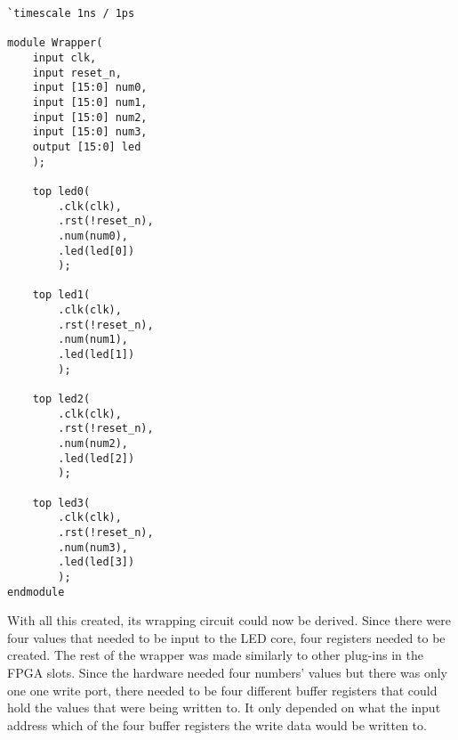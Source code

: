 \documentclass[11pt]{article}
\begin{document}
\begin{lstlisting}[style=Verilog,caption=Set of 4 LED blinkers,label=code:ex ]
`timescale 1ns / 1ps

module Wrapper(
	input clk,
	input reset_n,
	input [15:0] num0,
	input [15:0] num1,
	input [15:0] num2,
	input [15:0] num3,
	output [15:0] led
	);
	
	top led0( 
		.clk(clk), 
		.rst(!reset_n), 
		.num(num0), 
		.led(led[0])
		);
	
	top led1( 
		.clk(clk), 
		.rst(!reset_n), 
		.num(num1), 
		.led(led[1])
		);
	
	top led2( 
		.clk(clk), 
		.rst(!reset_n), 
		.num(num2), 
		.led(led[2])
		);
	
	top led3( 
		.clk(clk), 
		.rst(!reset_n), 
		.num(num3), 
		.led(led[3])
		);
endmodule
\end{lstlisting}

\quad With all this created, its wrapping circuit could now be derived. Since there were four values that needed to be input to the LED core, four registers needed to be created. The rest of the wrapper was made similarly to other plug-ins in the FPGA slots. Since the hardware needed four numbers' values but there was only one one write port, there needed to be four different buffer registers that could hold the values that were being written to. It only depended on what the input address which of the four buffer registers the write data would be written to.
\end{document}
